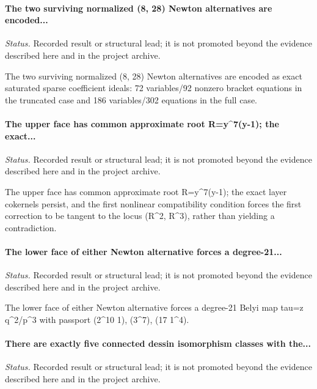 \label{supp-note-06-007}
\paragraph{The two surviving normalized (8, 28) Newton alternatives are encoded...}
\emph{Status.} Recorded result or structural lead; it is not promoted beyond the evidence described here and in the project archive.

The two surviving normalized (8, 28) Newton alternatives are encoded as exact saturated sparse coefficient ideals: 72 variables/92 nonzero bracket equations in the truncated case and 186 variables/302 equations in the full case.

\label{supp-note-06-008}
\paragraph{The upper face has common approximate root R=y\textasciicircum{}7(y-1); the exact...}
\emph{Status.} Recorded result or structural lead; it is not promoted beyond the evidence described here and in the project archive.

The upper face has common approximate root R=y\textasciicircum{}7(y-1); the exact layer cokernels persist, and the first nonlinear compatibility condition forces the first correction to be tangent to the locus (R\textasciicircum{}2, R\textasciicircum{}3), rather than yielding a contradiction.

\label{supp-note-06-009}
\paragraph{The lower face of either Newton alternative forces a degree-21...}
\emph{Status.} Recorded result or structural lead; it is not promoted beyond the evidence described here and in the project archive.

The lower face of either Newton alternative forces a degree-21 Belyi map tau=z q\textasciicircum{}2/p\textasciicircum{}3 with passport (2\textasciicircum{}10 1), (3\textasciicircum{}7), (17 1\textasciicircum{}4).

\label{supp-note-06-010}
\paragraph{There are exactly five connected dessin isomorphism classes with the...}
\emph{Status.} Recorded result or structural lead; it is not promoted beyond the evidence described here and in the project archive.

